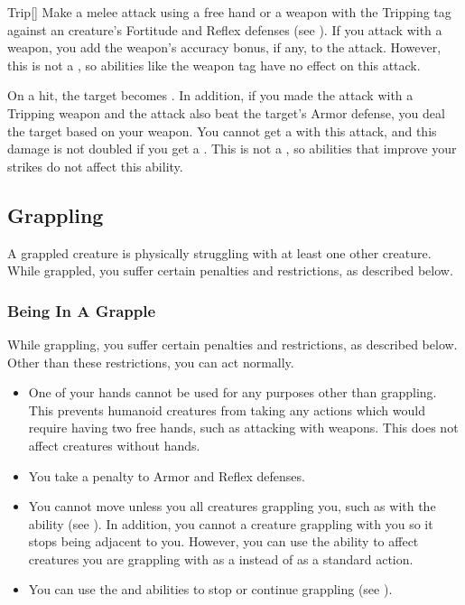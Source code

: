         \begin{activeability}{Trip}[]
            \rankline
            Make a melee attack using a free hand or a weapon with the Tripping tag against an creature's Fortitude and Reflex defenses (see ).
            If you attack with a weapon, you add the weapon's accuracy bonus, if any, to the attack.
            However, this is not a , so abilities like the  weapon tag have no effect on this attack.

            On a hit, the target becomes \prone.
            In addition, if you made the attack with a Tripping weapon and the attack also beat the target's Armor defense, you deal the target  based on your weapon.
            You cannot get a  with this attack, and this damage is not doubled if you get a .
            This is not a , so abilities that improve your strikes do not affect this ability.
        \end{activeability}

    \subsection{Grappling}\label{Grappling}
        A grappled creature is physically struggling with at least one other creature.
        While grappled, you suffer certain penalties and restrictions, as described below.

        \subsubsection{Being In A Grapple}
            While grappling, you suffer certain penalties and restrictions, as described below. Other than these restrictions, you can act normally.
            \begin{itemize}
                \item One of your hands cannot be used for any purposes other than grappling.
                    This prevents humanoid creatures from taking any actions which would require having two free hands, such as attacking with  weapons.
                    This does not affect creatures without hands.
                \item You take a  penalty to Armor and Reflex defenses.
                \item You cannot move unless you  all creatures grappling you, such as with the  ability (see ).
                    In addition, you cannot  a creature grappling with you so it stops being adjacent to you.
                    However, you can use the  ability to affect creatures you are grappling with as a  instead of as a standard action.
                \item You can use the  and  abilities to stop or continue grappling (see ).
            \end{itemize}

